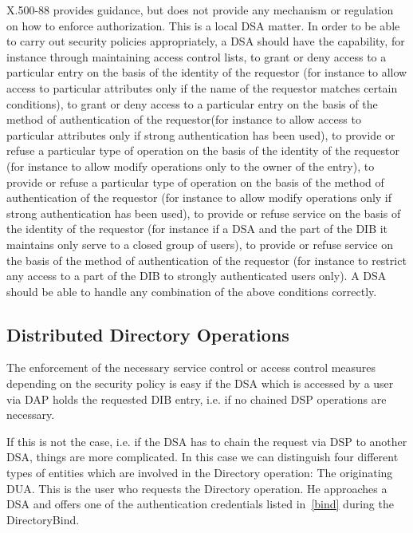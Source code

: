 X.500-88 provides guidance, but does not provide any mechanism or regulation on
how to enforce authorization. This is a local DSA matter. In order to be able
to carry out security policies appropriately, a DSA should have the capability,
for instance through maintaining access control lists, 
\bi
\m to grant or deny access to a particular entry on the basis of the identity 
  of the requestor (for instance to allow access to particular attributes only
  if the name of the requestor matches certain conditions),
\m to grant or deny access to a particular entry on the basis of the method of 
  authentication of the requestor(for instance to allow access to particular 
  attributes only if strong authentication has been used),
\m to provide or refuse a particular type of operation on the basis of the identity
  of the requestor (for instance to allow modify operations only to the owner
  of the entry),
\m to provide or refuse a particular type of operation on the basis of the method
  of authentication of the requestor (for instance to allow modify operations
  only if strong authentication has been used),
\m to provide or refuse service on the basis of the identity of the requestor (for
  instance if a DSA and the part of the DIB it maintains only serve  to
  a closed group of users),
\m to provide or refuse service on the basis of the method of authentication
  of the requestor (for instance to restrict any access to a part of the DIB
  to strongly authenticated users only).
\ei
A DSA should be able to handle any combination of the above conditions correctly.


\subsection{Distributed Directory Operations}


The enforcement of the necessary service control or access control measures
depending on the security policy is easy if the DSA which is accessed by a user
via DAP holds the requested DIB entry, i.e. if no chained DSP operations are
necessary.

If this is not the case, i.e. if the DSA has to chain the request via DSP to
another DSA, things are more complicated. In this case we can distinguish 
four different types of entities which are involved in the Directory operation:
\be
\m The originating DUA. This is the user who requests the Directory operation.
   He approaches a DSA and offers one of the authentication credentials listed
   in~\ref{bind} during the DirectoryBind.

